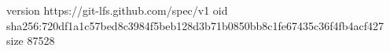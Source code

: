 version https://git-lfs.github.com/spec/v1
oid sha256:720df1a1c57bed8c3984f5beb128d3b71b0850bb8c1fe67435c36f4fb4acf427
size 87528
